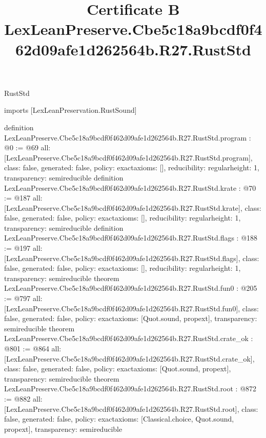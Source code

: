 \begin{lexlean}{RustStd}
\title{Certificate B LexLeanPreserve.Cbe5c18a9bcdf0f462d09afe1d262564b.R27.RustStd}
\begin{coremodule}
imports [LexLeanPreservation.RustSound]

definition LexLeanPreserve.Cbe5c18a9bcdf0f462d09afe1d262564b.R27.RustStd.program : @0 := @69 {
  all: [LexLeanPreserve.Cbe5c18a9bcdf0f462d09afe1d262564b.R27.RustStd.program],
  class: false,
  generated: false,
  policy: exact{axioms: []},
  reducibility: regular{height: 1},
  transparency: semireducible
}
definition LexLeanPreserve.Cbe5c18a9bcdf0f462d09afe1d262564b.R27.RustStd.krate : @70 := @187 {
  all: [LexLeanPreserve.Cbe5c18a9bcdf0f462d09afe1d262564b.R27.RustStd.krate],
  class: false,
  generated: false,
  policy: exact{axioms: []},
  reducibility: regular{height: 1},
  transparency: semireducible
}
definition LexLeanPreserve.Cbe5c18a9bcdf0f462d09afe1d262564b.R27.RustStd.flags : @188 := @197 {
  all: [LexLeanPreserve.Cbe5c18a9bcdf0f462d09afe1d262564b.R27.RustStd.flags],
  class: false,
  generated: false,
  policy: exact{axioms: []},
  reducibility: regular{height: 1},
  transparency: semireducible
}
theorem LexLeanPreserve.Cbe5c18a9bcdf0f462d09afe1d262564b.R27.RustStd.fun0 : @205 := @797 {
  all: [LexLeanPreserve.Cbe5c18a9bcdf0f462d09afe1d262564b.R27.RustStd.fun0],
  class: false,
  generated: false,
  policy: exact{axioms: [Quot.sound, propext]},
  transparency: semireducible
}
theorem LexLeanPreserve.Cbe5c18a9bcdf0f462d09afe1d262564b.R27.RustStd.crate_ok : @801 := @864 {
  all: [LexLeanPreserve.Cbe5c18a9bcdf0f462d09afe1d262564b.R27.RustStd.crate_ok],
  class: false,
  generated: false,
  policy: exact{axioms: [Quot.sound, propext]},
  transparency: semireducible
}
theorem LexLeanPreserve.Cbe5c18a9bcdf0f462d09afe1d262564b.R27.RustStd.root : @872 := @882 {
  all: [LexLeanPreserve.Cbe5c18a9bcdf0f462d09afe1d262564b.R27.RustStd.root],
  class: false,
  generated: false,
  policy: exact{axioms: [Classical.choice, Quot.sound, propext]},
  transparency: semireducible
}


\end{coremodule}
\end{lexlean}
